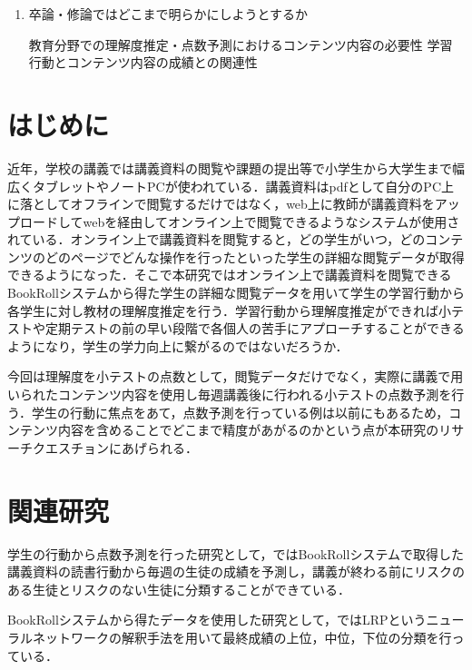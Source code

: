 \documentclass[a4j]{jarticle}
\begin{document}
\begin{enumerate}
 
 
\item 卒論・修論ではどこまで明らかにしようとするか

     \begin{boxedminipage}{\linewidth}
      教育分野での理解度推定・点数予測におけるコンテンツ内容の必要性
      学習行動とコンテンツ内容の成績との関連性
      \end{boxedminipage}
 
\end{enumerate}
 
\newpage
 
\twocolumn
 
\section{はじめに}

近年，学校の講義では講義資料の閲覧や課題の提出等で小学生から大学生まで幅広くタブレットやノートPCが使われている．講義資料はpdfとして自分のPC上に落としてオフラインで閲覧するだけではなく，web上に教師が講義資料をアップロードしてwebを経由してオンライン上で閲覧できるようなシステムが使用されている．オンライン上で講義資料を閲覧すると，どの学生がいつ，どのコンテンツのどのページでどんな操作を行ったといった学生の詳細な閲覧データが取得できるようになった．そこで本研究ではオンライン上で講義資料を閲覧できるBookRollシステムから得た学生の詳細な閲覧データを用いて学生の学習行動から各学生に対し教材の理解度推定を行う．学習行動から理解度推定ができれば小テストや定期テストの前の早い段階で各個人の苦手にアプローチすることができるようになり，学生の学力向上に繋がるのではないだろうか．

今回は理解度を小テストの点数として，閲覧データだけでなく，実際に講義で用いられたコンテンツ内容を使用し毎週講義後に行われる小テストの点数予測を行う．学生の行動に焦点をあて，点数予測を行っている例は以前にもあるため，コンテンツ内容を含めることでどこまで精度があがるのかという点が本研究のリサーチクエスチョンにあげられる．

\section{関連研究}

学生の行動から点数予測を行った研究として，\cite{yosoku}ではBookRollシステムで取得した講義資料の読書行動から毎週の生徒の成績を予測し，講義が終わる前にリスクのある生徒とリスクのない生徒に分類することができている．

BookRollシステムから得たデータを使用した研究として，\cite{BR1}ではLRPというニューラルネットワークの解釈手法を用いて最終成績の上位，中位，下位の分類を行っている．
\end{document}
